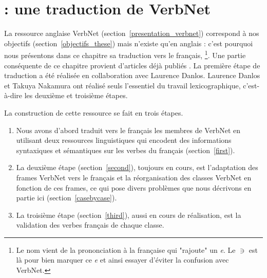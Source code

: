 \chapter{\verbenet{} : une traduction de VerbNet}
\label{ch:verbnet}

La ressource anglaise VerbNet (section~\ref{presentation_verbnet}) correspond à
nos objectifs (section~\ref{objectifs_these}) mais n'existe qu'en anglais :
c'est pourquoi nous présentons dans ce chapitre sa traduction vers le français,
\verbenet{}\footnote{Le nom vient de la prononciation à la française qui
"rajoute" un \textit{e}. Le $\ni$ est là pour bien marquer ce \textit{e} et
ainsi essayer d'éviter la confusion avec VerbNet.}. Une partie conséquente de
ce chapitre provient d'articles déjà publiés
\citep{danlos2014vers,pradet2014adapting}. La première étape de traduction a
été réalisée en collaboration avec Laurence Danlos. Laurence Danlos et Takuya
Nakamura ont réalisé seuls l'essentiel du travail lexicographique, c'est-à-dire
les deuxième et troisième étapes.

La construction de cette ressource se fait en trois étapes.
\begin{enumerate}
    \item Nous avons d'abord traduit vers le français les membres de VerbNet en
        utilisant deux ressources linguistiques qui encodent des informations
        syntaxiques et sémantiques sur les verbes du français
        (section~\ref{first}).
    \item La deuxième étape (section~\ref{second}), toujours en cours, est
        l'adaptation des frames VerbNet vers le français et la réorganisation
        des classes VerbNet en fonction de ces frames, ce qui pose divers
        problèmes que nous décrivons en partie ici (section~\ref{casebycase}).
    \item La troisième étape (section~\ref{third}), aussi en cours de
        réalisation, est la validation des verbes français de chaque classe.
\end{enumerate}

